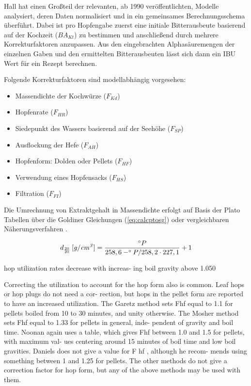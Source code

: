 \documentclass[a4paper,parskip=half]{scrartcl}
\newcommand{\BAKt}{{\mathit{BA}}_{\mathit{Kt}}}
\newcommand{\uden}{\:[\mathit{g/cm^3}]}
\newcommand{\FKd}{F_{\mathit{Kd}}}
\newcommand{\FHR}{F_{\mathit{HR}}}
\newcommand{\FSP}{F_{\mathit{SP}}}
\newcommand{\FAH}{F_{\mathit{AH}}}
\newcommand{\FHF}{F_{\mathit{HF}}}
\newcommand{\FHS}{F_{\mathit{HS}}}
\newcommand{\FFil}{F_{\mathit{FI}}}
\begin{document}
Hall hat einen Großteil der relevanten, ab 1990 veröffentlichten, Modelle analysiert,
deren Daten normalisiert und in ein gemeinsames Berechnungsschema überführt. Dabei ist
pro Hopfengabe zuerst eine initiale Bitterausbeute basierend auf der Kochzeit
($\BAKt$) zu bestimmen und anschließend durch mehrere Korrekturfaktoren anzupassen.
Aus den eingebrachten Alphasäuremengen der einzelnen Gaben und den ermittelten
Bitterausbeuten lässt sich dann ein IBU Wert für ein Rezept berechnen. \parencite[59-65]{Hall1997}


Folgende Korrekturfaktoren sind modellabhängig vorgesehen:

\begin{itemize}
\item Massendichte der Kochwürze ($\FKd$)
\item Hopfenrate ($\FHR$)
\item Siedepunkt des Wassers basierend auf der Seehöhe ($\FSP$)
\item Ausflockung der Hefe ($\FAH$)
\item Hopfenform: Dolden oder Pellets ($\FHF$)
\item Verwendung eines Hopfensacks ($\FHS$)
\item Filtration ($\FFil$)
\end{itemize}

Die Umrechnung von Extraktgehalt in Massendichte erfolgt auf Basis
der Plato Tabellen über die Goldiner Gleichungen (\autoref{eq:calcptosg})
oder vergleichbaren Näherungsverfahren \parencite[140\psq]{Spedding2016}.

\begin{equation}
d_{\frac{20}{20}} \uden = \frac{\degree P}{258,6 - \degree P / 258,2 \cdot 227,1} + 1
\label{eq:calcptosg}
\end{equation}

\parencite[62]{Hall1997}
hop utilization rates decrease with increas-
ing boil gravity above 1.050

Correcting the utilization to
account for the hop form also is common.
Leaf hops or hop plugs do not need a cor-
rection, but hops in the pellet form are
reported to have an increased utilization.
The Garetz method sets Fhf equal to 1.1 for
pellets boiled from 10 to 30 minutes, and
unity otherwise. The Mosher method sets
Fhf equal to 1.33 for pellets in general, inde-
pendent of gravity and boil time. Noonan
again uses a table, which gives Fhf between
1.0 and 1.5 for pellets, with maximum val-
ues centering around 15 minutes of boil
time and low boil gravities. Daniels does not
give a value for F hf , although he recom-
mends using something between 1 and 1.25
for pellets. The other methods do not give
a correction factor for hop form, but any of
the above methods may be used with them.
\end{document}
